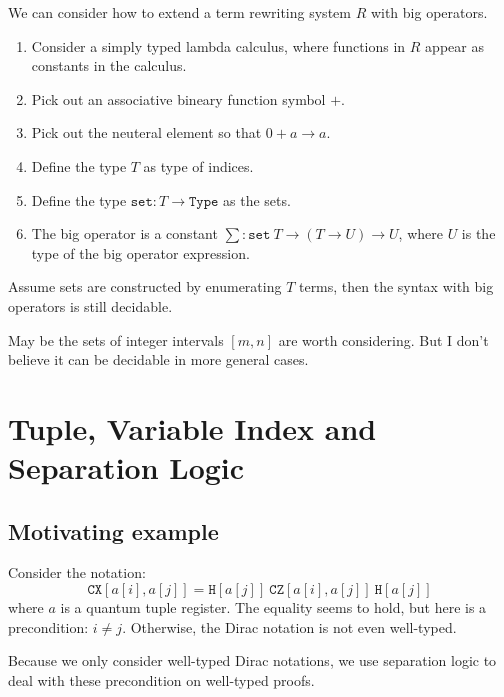 \begin{example}
  We can consider how to extend a term rewriting system $R$ with big operators.

  \begin{enumerate}
    \item Consider a simply typed lambda calculus, where functions in $R$ appear as constants in the calculus.
    \item Pick out an associative bineary function symbol $+$.
    \item Pick out the neuteral element so that $0 + a \to a$.
    \item Define the type $T$ as type of indices.
    \item Define the type $\texttt{set} : T \to \texttt{Type}$ as the sets.
    \item The big operator is a constant $\sum : \texttt{set}\ T \to (T \to U) \to U$, where $U$ is the type of the big operator expression.
  \end{enumerate}
\end{example}


\begin{example}
  Assume sets are constructed by enumerating $T$ terms, then the syntax with big operators is still decidable.
\end{example}

May be the sets of integer intervals $[m, n]$ are worth considering. But I don't believe it can be decidable in more general cases.


\section{Tuple, Variable Index and Separation Logic}

\subsection{Motivating example}

Consider the notation:
$$
\texttt{CX}[a[i], a[j]] = \texttt{H}[a[j]]\ \texttt{CZ}[a[i], a[j]]\ \texttt{H}[a[j]]
$$
where $a$ is a quantum tuple register. The equality seems to hold, but here is a precondition: $i \neq j$. Otherwise, the Dirac notation is not even well-typed. 

Because we only consider well-typed Dirac notations, we use separation logic to deal with these precondition on well-typed proofs.